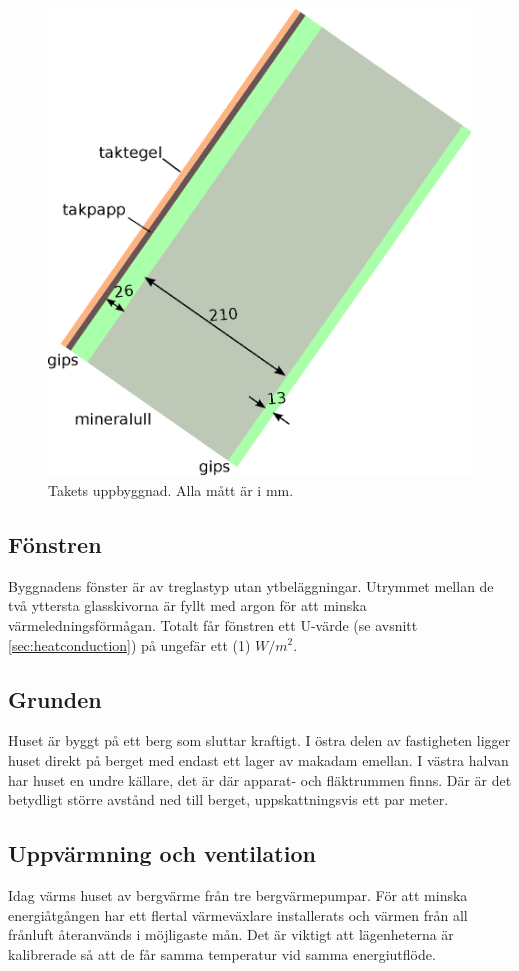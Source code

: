 \begin{figure}[hpbt]
\centering
\includegraphics[width=0.3\textheight]{images/taket.eps}
\caption{\label{fig:taket}{Takets uppbyggnad. Alla mått är i mm.}}
\end{figure}

\subsection{Fönstren}

Byggnadens fönster är av treglastyp utan ytbeläggningar. Utrymmet mellan de två yttersta glasskivorna är fyllt med argon för att minska värmeledningsförmågan. Totalt får fönstren ett U-värde (se avsnitt \ref{sec:heatconduction}) på ungefär ett (1) $\unit{}{W/m^2}$. 

\subsection{Grunden}

Huset är byggt på ett berg som sluttar kraftigt. I östra delen av fastigheten ligger huset direkt på berget med endast ett lager av makadam emellan\cite{petersarneo}. I västra halvan har huset en undre källare, det är där apparat- och fläktrummen finns. Där är det betydligt större avstånd ned till berget, uppskattningsvis ett par meter. %

\subsection{Uppvärmning och ventilation}
Idag värms huset av bergvärme från tre bergvärmepumpar. För att minska energiåtgången har ett flertal värmeväxlare installerats och värmen från all frånluft återanvänds i möjligaste mån.
Det är viktigt att lägenheterna är kalibrerade så att de får samma temperatur vid samma energiutflöde.


